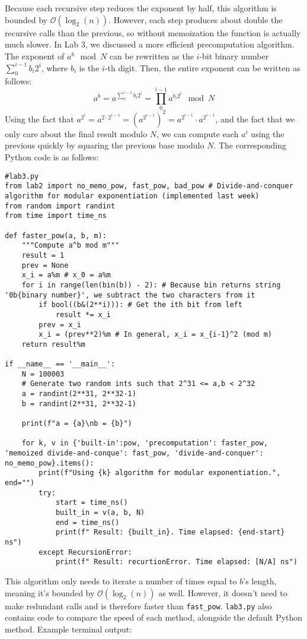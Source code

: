 \documentclass[a4paper,10pt]{article}
\begin{document}
Because each recursive step reduces the exponent by half, this algorithm is bounded by $\mathcal{O}(\log_2(n))$. However, each step produces about double the recursive calls than the previous, so without memoization the function is actually much slower.
\newpage
In Lab 3, we discussed a more efficient precomputation algorithm. The exponent of $a^b \mod N$ can be rewritten as the $i$-bit binary number $\sum_{0}^{i-1}b_i2^i$, where $b_i$ is the $i$-th digit. Then, the entire exponent can be written as follows:
$$ a^b = a^{\sum_{0}^{i-1}b_i2^i} = \prod_{0}^{i-1} a^{b_i2^i} \mod N$$
Using the fact that $a^{2^i} = a^{2 \cdot 2^{i-1}} = (a^{2^{i-1}})^2 =  a^{2^{i-1}} \cdot a^{2^{i-1}}$, and the fact that we only care about the final result modulo $N$, we can compute each $a^i$ using the previous quickly by squaring the previous base modulo $N$. The corresponding Python code is as follows:
\begin{lstlisting}
#lab3.py
from lab2 import no_memo_pow, fast_pow, bad_pow # Divide-and-conquer algorithm for modular exponentiation (implemented last week)
from random import randint
from time import time_ns

def faster_pow(a, b, m):
    """Compute a^b mod m"""
    result = 1
    prev = None
    x_i = a%m # x_0 = a%m
    for i in range(len(bin(b)) - 2): # Because bin returns string '0b{binary number}', we subtract the two characters from it
        if bool((b&(2**i))): # Get the ith bit from left
            result *= x_i
        prev = x_i
        x_i = (prev**2)%m # In general, x_i = x_{i-1}^2 (mod m)
    return result%m

if __name__ == '__main__':
    N = 100003
    # Generate two random ints such that 2^31 <= a,b < 2^32
    a = randint(2**31, 2**32-1)
    b = randint(2**31, 2**32-1)

    print(f"a = {a}\nb = {b}")

    for k, v in {'built-in':pow, 'precomputation': faster_pow, 'memoized divide-and-conque': fast_pow, 'divide-and-conquer': no_memo_pow}.items():
        print(f"Using {k} algorithm for modular exponentiation.", end="")
        try:
            start = time_ns()
            built_in = v(a, b, N)
            end = time_ns()
            print(f" Result: {built_in}. Time elapsed: {end-start} ns")
        except RecursionError:
            print(f" Result: recurtionError. Time elapsed: [N/A] ns")
\end{lstlisting}
This algorithm only needs to iterate a number of times equal to $b$'s length, meaning it's bounded by $\mathcal{O}(\log_2(n))$ as well. However, it doesn't need to make redundant calls and is therefore faster than \verb|fast_pow|. \verb|lab3.py| also contains code to compare the speed of each method, alongside the default Python method. Example terminal output:
\end{document}
